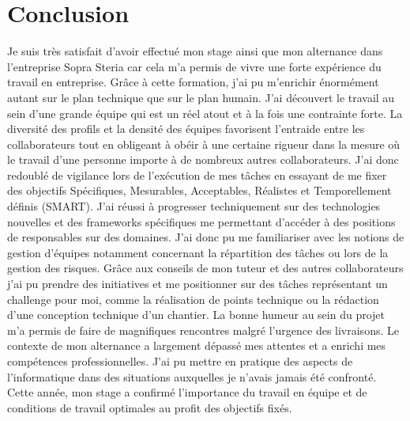 \documentclass[12pt,a4paper]{article}
\begin{document}
\section{Conclusion}
Je suis très satisfait d’avoir effectué mon stage ainsi que mon alternance dans l'entreprise Sopra Steria car cela m’a permis de vivre une forte expérience du travail en entreprise. Grâce à cette formation, j’ai pu m’enrichir énormément autant sur le plan technique que sur le plan humain.
\medbreak
J’ai découvert le travail au sein d'une grande équipe qui est un réel atout et à la fois une contrainte forte. La diversité des profils et la densité des équipes favorisent l'entraide entre les collaborateurs tout en obligeant à obéir à une certaine rigueur dans la mesure où le travail d'une personne importe à de nombreux autres collaborateurs. J’ai donc redoublé de vigilance lors de l’exécution de mes tâches en essayant de me fixer des objectifs Spécifiques, Mesurables, Acceptables, Réalistes et Temporellement définis (SMART).
\medbreak
J'ai réussi à progresser techniquement sur des technologies nouvelles et des frameworks spécifiques me permettant d'accéder à des positions de responsables sur des domaines. J'ai donc pu me familiariser avec les notions de gestion d'équipes notamment concernant la répartition des tâches ou lors de la gestion des risques. Grâce aux conseils de mon tuteur et des autres collaborateurs j'ai pu prendre des initiatives et me positionner sur des tâches représentant un challenge pour moi, comme la réalisation de points technique ou la rédaction d'une conception technique d'un chantier. \bigbreak
La bonne humeur au sein du projet m'a permis de faire de magnifiques rencontres malgré l’urgence des livraisons. Le contexte de mon alternance a largement dépassé mes attentes et a enrichi mes compétences professionnelles. J'ai pu mettre en pratique des aspects de l'informatique dans des situations auxquelles je n'avais jamais été confronté.
Cette année, mon stage a confirmé l'importance du travail en équipe et de conditions de travail optimales au profit des objectifs fixés.
\end{document}
